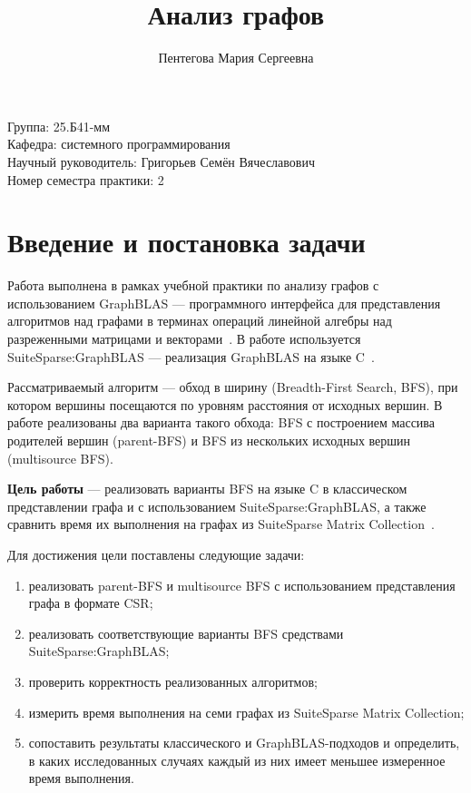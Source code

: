 \documentclass[a4paper,10pt]{article}
\begin{document}
\raggedbottom

\title{Анализ графов}
\author{Пентегова Мария Сергеевна}
\date{}
\maketitle

\begin{flushright}
Группа: 25.Б41-мм \\
Кафедра: системного программирования \\
Научный руководитель: Григорьев Семён Вячеславович \\
Номер семестра практики: 2
\end{flushright}

\section{Введение и постановка задачи}

Работа выполнена в рамках учебной практики по анализу графов с
использованием GraphBLAS --- программного интерфейса для представления
алгоритмов над графами в терминах операций линейной алгебры над
разреженными матрицами и векторами~\cite{graphblas-api}. В работе
используется SuiteSparse:GraphBLAS --- реализация GraphBLAS на языке
C~\cite{graphblas}.

Рассматриваемый алгоритм --- обход в ширину (Breadth-First Search,
BFS), при котором вершины посещаются по уровням расстояния от исходных
вершин. В работе реализованы два варианта такого обхода: BFS с
построением массива родителей вершин (parent-BFS) и BFS из нескольких
исходных вершин (multisource BFS).

\textbf{Цель работы} --- реализовать варианты BFS на языке C в
классическом представлении графа и с использованием SuiteSparse:GraphBLAS,
а также сравнить время их выполнения на графах из SuiteSparse Matrix
Collection~\cite{ssmc}.

Для достижения цели поставлены следующие задачи:
\begin{enumerate}
    \item реализовать parent-BFS и multisource BFS с использованием
    представления графа в формате CSR;
    \item реализовать соответствующие варианты BFS средствами
    SuiteSparse:GraphBLAS;
    \item проверить корректность реализованных алгоритмов;
    \item измерить время выполнения на семи графах из SuiteSparse Matrix
    Collection;
    \item сопоставить результаты классического и GraphBLAS-подходов и
    определить, в каких исследованных случаях каждый из них имеет
    меньшее измеренное время выполнения.
\end{enumerate}
\end{document}
